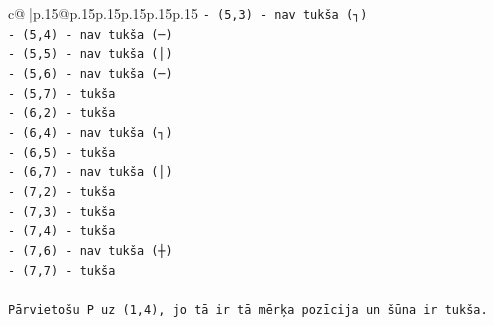 \documentclass{article}
\begin{document}
{\begin{supertabular}{c@{$\;$}|p{.15\linewidth}@{}p{.15\linewidth}p{.15\linewidth}p{.15\linewidth}p{.15\linewidth}p{.15\linewidth}}
{{{\texttt{{-} (5,3) {-} nav tukša (┐)} \\
\texttt{{-} (5,4) {-} nav tukša (─)} \\
\texttt{{-} (5,5) {-} nav tukša (│)} \\
\texttt{{-} (5,6) {-} nav tukša (─)} \\
\texttt{{-} (5,7) {-} tukša} \\
\texttt{{-} (6,2) {-} tukša} \\
\texttt{{-} (6,4) {-} nav tukša (┐)} \\
\texttt{{-} (6,5) {-} tukša} \\
\texttt{{-} (6,7) {-} nav tukša (│)} \\
\texttt{{-} (7,2) {-} tukša} \\
\texttt{{-} (7,3) {-} tukša} \\
\texttt{{-} (7,4) {-} tukša} \\
\texttt{{-} (7,6) {-} nav tukša (┼)} \\
\texttt{{-} (7,7) {-} tukša} \\
\\ 
\texttt{Pārvietošu P uz (1,4), jo tā ir tā mērķa pozīcija un šūna ir tukša.} \\
            }
        }
    }
     \\ \\


\end{supertabular}}
\end{document}
